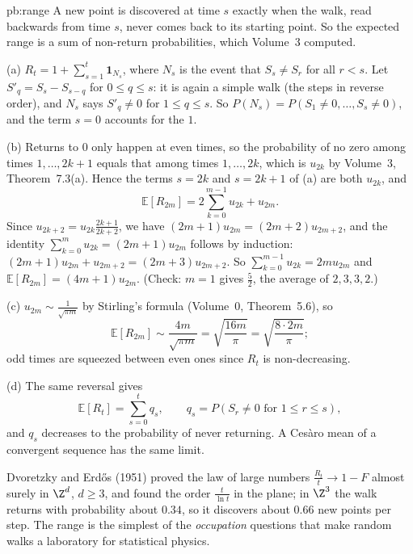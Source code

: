 \begin{solution}{pb:range}
\idea A new point is discovered at time $s$ exactly when the walk, read backwards from time $s$, never comes back to its starting point.
So the expected range is a sum of non-return probabilities, which Volume~3 computed.

\writeup (a) $R_t=1+\sum_{s=1}^t\mathbf 1_{N_s}$, where $N_s$ is the event that $S_s\ne S_r$ for all $r<s$. Let $S'_q=S_s-S_{s-q}$ for $0\le q\le s$: it is again a simple walk (the steps in
reverse order), and $N_s$ says $S'_q\ne0$ for $1\le q\le s$. So $P(N_s)=P(S_1\ne0,\dots,S_s\ne0)$, and the term $s=0$ accounts for the $1$.

(b) Returns to $0$ only happen at even times, so the probability of no zero among times $1,\dots,2k+1$ equals that among times $1,\dots,2k$, which is
$u_{2k}$ by Volume~3, Theorem~7.3(a). Hence the terms $s=2k$ and $s=2k+1$ of (a) are both $u_{2k}$, and
\[
\mathbb E[R_{2m}]=2\sum_{k=0}^{m-1}u_{2k}+u_{2m}.
\]
Since $u_{2k+2}=u_{2k}\frac{2k+1}{2k+2}$, we have $(2m+1)u_{2m}=(2m+2)u_{2m+2}$, and the identity $\sum_{k=0}^mu_{2k}=(2m+1)u_{2m}$ follows by induction:
$(2m+1)u_{2m}+u_{2m+2}=(2m+3)u_{2m+2}$. So $\sum_{k=0}^{m-1}u_{2k}=2mu_{2m}$ and $\mathbb E[R_{2m}]=(4m+1)u_{2m}$. (Check: $m=1$ gives $\frac52$, the average of $2,3,3,2$.)

(c) $u_{2m}\sim\frac1{\sqrt{\pi m}}$ by Stirling's formula (Volume~0, Theorem~5.6), so
\[
\mathbb E[R_{2m}]\sim\frac{4m}{\sqrt{\pi m}}=\sqrt{\frac{16m}\pi}=\sqrt{\frac{8\cdot2m}\pi};
\]
odd times are squeezed between even ones since $R_t$ is non-decreasing.

(d) The same reversal gives
\[
\mathbb E[R_t]=\sum_{s=0}^tq_s,\qquad q_s=P(S_r\ne0\text{ for }1\le r\le s),
\]
and $q_s$ decreases to the probability of never returning. A Cesàro mean of a convergent sequence has the same limit.

\leads Dvoretzky and Erdős (1951) proved the law of large numbers $\frac{R_t}t\to1-F$ almost surely in $\Z^d$, $d\ge3$, and found the order $\frac t{\ln t}$ in the plane;
in $\Z^3$ the walk returns with probability about $0.34$, so it discovers about $0.66$ new points per step. The range is the simplest of the
\emph{occupation} questions that make random walks a laboratory for statistical physics.
\end{solution}

